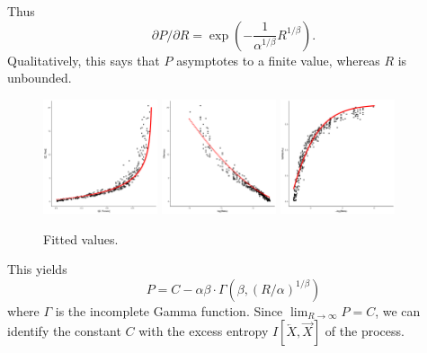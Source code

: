 \documentclass[11pt,letterpaper]{article}
\newif \ifcomment
\newcommand\rljf[1]{\ifcomment{{\color{blue}(#1)}}\else{}\fi}
\begin{document}
Thus
\begin{equation}\label{eq:derivatives}
	\partial P/\partial R = \exp\left(-\frac{1}{\alpha^{1/\beta}} R^{1/\beta}\right). %
\end{equation}
Qualitatively, this says that $P$ asymptotes to a finite value, whereas $R$ is unbounded. \rljf{Exactly the opposite of Dembowski's finding}



\begin{figure}
\includegraphics[width=0.3\textwidth]{code/figures/english-info-fitted.pdf}
\includegraphics[width=0.3\textwidth]{code/figures/english-logbeta-mem-fitted.pdf}
	\includegraphics[width=0.3\textwidth]{code/figures/english-nlogbeta-ee-fitted.pdf}
	\caption{Fitted values. \rljf{Definitely need a better label, also axis labels are too small to read}}\label{fig:eng-pos-fitted}
\end{figure}

This yields
\begin{equation}
	P = C - \alpha\beta \cdot \Gamma\left(\beta, (R/\alpha)^{1/\beta}\right)
\end{equation}
where $\Gamma$ is the incomplete Gamma function.
Since $\lim_{R \rightarrow \infty} P = C$, we can identify the constant $C$ with the excess entropy $I[\overleftarrow{X}, \overrightarrow{X}]$ of the process.
\end{document}
